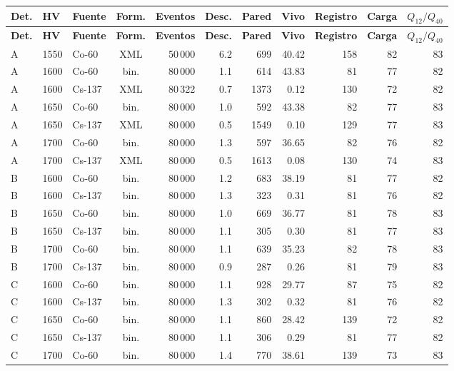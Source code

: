 \begin{longtable}{lllcrrrrrrr}
\toprule
\textbf{Det.} & \textbf{HV} & \textbf{Fuente} & \textbf{Form.} & \textbf{Eventos} & \textbf{Desc.} & \textbf{Pared} & \textbf{Vivo} & \textbf{Registro} & \textbf{Carga} & \textbf{$Q_{12}/Q_{40}$} \\
\midrule
\endfirsthead
\toprule
\textbf{Det.} & \textbf{HV} & \textbf{Fuente} & \textbf{Form.} & \textbf{Eventos} & \textbf{Desc.} & \textbf{Pared} & \textbf{Vivo} & \textbf{Registro} & \textbf{Carga} & \textbf{$Q_{12}/Q_{40}$} \\
\midrule
\endhead
A & 1550 & Co-60 & XML & 50\,000 & 6.2 & 699 & 40.42 & 158 & 82 & 83 \\
A & 1600 & Co-60 & bin. & 80\,000 & 1.1 & 614 & 43.83 & 81 & 77 & 82 \\
A & 1600 & Cs-137 & XML & 80\,322 & 0.7 & 1373 & 0.12 & 130 & 72 & 82 \\
A & 1650 & Co-60 & bin. & 80\,000 & 1.0 & 592 & 43.38 & 82 & 77 & 83 \\
A & 1650 & Cs-137 & XML & 80\,000 & 0.5 & 1549 & 0.10 & 129 & 77 & 83 \\
A & 1700 & Co-60 & bin. & 80\,000 & 1.3 & 597 & 36.65 & 82 & 76 & 82 \\
A & 1700 & Cs-137 & XML & 80\,000 & 0.5 & 1613 & 0.08 & 130 & 74 & 83 \\
\midrule
B & 1600 & Co-60 & bin. & 80\,000 & 1.2 & 683 & 38.19 & 81 & 77 & 82 \\
B & 1600 & Cs-137 & bin. & 80\,000 & 1.3 & 323 & 0.31 & 81 & 76 & 82 \\
B & 1650 & Co-60 & bin. & 80\,000 & 1.0 & 669 & 36.77 & 81 & 78 & 83 \\
B & 1650 & Cs-137 & bin. & 80\,000 & 1.1 & 305 & 0.30 & 81 & 77 & 83 \\
B & 1700 & Co-60 & bin. & 80\,000 & 1.1 & 639 & 35.23 & 82 & 78 & 83 \\
B & 1700 & Cs-137 & bin. & 80\,000 & 0.9 & 287 & 0.26 & 81 & 79 & 83 \\
\midrule
C & 1600 & Co-60 & bin. & 80\,000 & 1.1 & 928 & 29.77 & 87 & 75 & 82 \\
C & 1600 & Cs-137 & bin. & 80\,000 & 1.3 & 302 & 0.32 & 81 & 76 & 82 \\
C & 1650 & Co-60 & bin. & 80\,000 & 1.1 & 860 & 28.42 & 139 & 72 & 82 \\
C & 1650 & Cs-137 & bin. & 80\,000 & 1.1 & 306 & 0.29 & 81 & 77 & 82 \\
C & 1700 & Co-60 & bin. & 80\,000 & 1.4 & 770 & 38.61 & 139 & 73 & 83 \\

\end{longtable}
